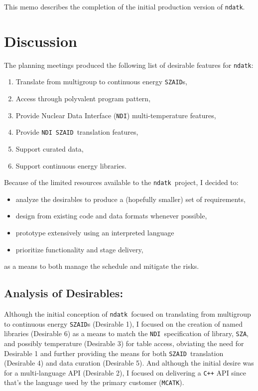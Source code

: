 \documentclass[12pt]{lamemo}
\newcommand{\ndatk}{\texttt{ndatk}}
\newcommand{\MCATK}{\texttt{MCATK}}
\newcommand{\NDI}{\texttt{NDI}}
\newcommand{\zaid}{\texttt{SZAID}}
\begin{document}
This memo describes the completion of the initial production version of \ndatk.
\newpage

\section{Discussion}

The planning meetings produced the following list of desirable
features for \ndatk:
\begin{enumerate}
\item Translate from multigroup to continuous energy \zaid s,
\item Access through polyvalent program pattern\cite[p. 281]{raymond04},
\item Provide Nuclear Data Interface\cite{campbell98} (\NDI)
  multi-temperature features,
\item Provide \NDI\ \zaid\ translation features,
\item Support curated data,
\item Support continuous energy libraries.
\end{enumerate}

Because of the limited resources available to the \ndatk\ project, I
decided to:
\begin{itemize}
\item analyze the desirables to produce a (hopefully smaller) set of
  requirements, 
\item design from existing code and data formats whenever possible,
\item prototype extensively using an interpreted language
\item prioritize functionality and stage delivery,
\end{itemize}
as a means to both manage the schedule and mitigate the risks.

\subsection{\hspace{-1.5em}Analysis of Desirables: }
Although the initial conception of \ndatk\ focused on translating from
multigroup to continuous energy \zaid s (Desirable 1), I focused on
the creation of named libraries (Desirable 6) as a means to match the
\NDI\ specification of library, \texttt{SZA}, and possibly temperature
(Desirable 3) for table access, obviating the need for Desirable 1 and
further providing the means for both \zaid\ translation (Desirable 4)
and data curation (Desirable 5).  And although the initial desire was
for a multi-language API (Desirable 2), I focused on delivering a
\texttt{C++} API since that's the language used by the primary
customer (\MCATK).
\end{document}
